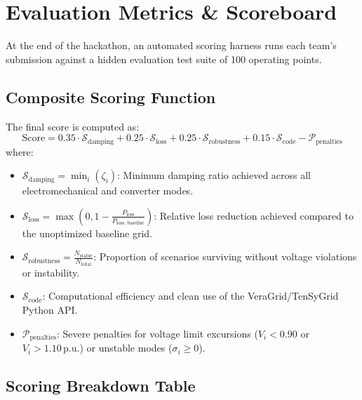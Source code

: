 \documentclass[11pt,a4paper]{article}
\begin{document}
\section{Evaluation Metrics \& Scoreboard}

At the end of the hackathon, an automated scoring harness runs each team's submission against a hidden evaluation test suite of 100 operating points.

\subsection{Composite Scoring Function}
The final score is computed as:
\begin{equation}
  \text{Score} = 0.35 \cdot \mathcal{S}_{\text{damping}} + 0.25 \cdot \mathcal{S}_{\text{loss}} + 0.25 \cdot \mathcal{S}_{\text{robustness}} + 0.15 \cdot \mathcal{S}_{\text{code}} - \mathcal{P}_{\text{penalties}}
\end{equation}
where:
\begin{itemize}[leftmargin=*, itemsep=2pt]
  \item $\mathcal{S}_{\text{damping}} = \min_{i} (\zeta_i)$: Minimum damping ratio achieved across all electromechanical and converter modes.
  \item $\mathcal{S}_{\text{loss}} = \max\left(0, 1 - \frac{P_{\text{loss}}}{P_{\text{loss, baseline}}}\right)$: Relative loss reduction achieved compared to the unoptimized baseline grid.
  \item $\mathcal{S}_{\text{robustness}} = \frac{N_{\text{stable}}}{N_{\text{total}}}$: Proportion of scenarios surviving without voltage violations or instability.
  \item $\mathcal{S}_{\text{code}}$: Computational efficiency and clean use of the VeraGrid/TenSyGrid Python API.
  \item $\mathcal{P}_{\text{penalties}}$: Severe penalties for voltage limit excursions ($V_i < 0.90$ or $V_i > 1.10\,\text{p.u.}$) or unstable modes ($\sigma_i \ge 0$).
\end{itemize}

\subsection{Scoring Breakdown Table}
\end{document}
